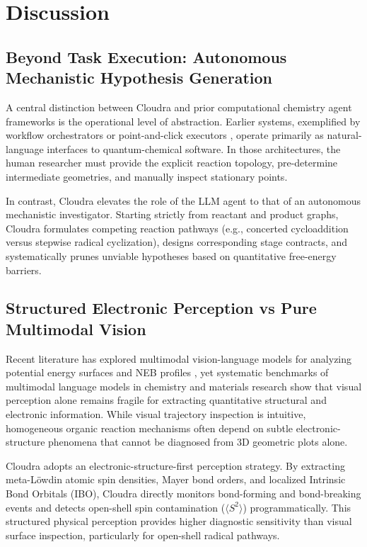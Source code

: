 \documentclass[10pt,twocolumn,letterpaper]{article}
\begin{document}
\section{Discussion}

\subsection{Beyond Task Execution: Autonomous Mechanistic Hypothesis Generation}
A central distinction between Cloudra and prior computational chemistry agent frameworks is the operational level of abstraction. Earlier systems, exemplified by workflow orchestrators \cite{zou2025elagente,chemgraph2026} or point-and-click executors \cite{aitomia2026}, operate primarily as natural-language interfaces to quantum-chemical software. In those architectures, the human researcher must provide the explicit reaction topology, pre-determine intermediate geometries, and manually inspect stationary points.

In contrast, Cloudra elevates the role of the LLM agent to that of an autonomous mechanistic investigator. Starting strictly from reactant and product graphs, Cloudra formulates competing reaction pathways (e.g., concerted cycloaddition versus stepwise radical cyclization), designs corresponding stage contracts, and systematically prunes unviable hypotheses based on quantitative free-energy barriers.

\subsection{Structured Electronic Perception vs Pure Multimodal Vision}
Recent literature has explored multimodal vision-language models for analyzing potential energy surfaces and NEB profiles \cite{tsagent2026}, yet systematic benchmarks of multimodal language models in chemistry and materials research \cite{alampara2025macbench} show that visual perception alone remains fragile for extracting quantitative structural and electronic information. While visual trajectory inspection is intuitive, homogeneous organic reaction mechanisms often depend on subtle electronic-structure phenomena that cannot be diagnosed from 3D geometric plots alone.

Cloudra adopts an electronic-structure-first perception strategy. By extracting meta-Löwdin atomic spin densities, Mayer bond orders, and localized Intrinsic Bond Orbitals (IBO), Cloudra directly monitors bond-forming and bond-breaking events and detects open-shell spin contamination ($\langle S^2 \rangle$) programmatically. This structured physical perception provides higher diagnostic sensitivity than visual surface inspection, particularly for open-shell radical pathways.
\end{document}
